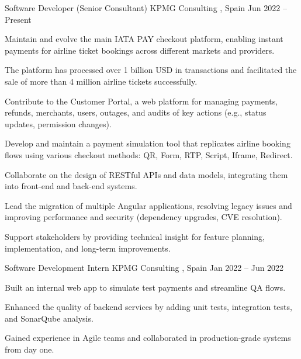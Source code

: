 

\begin{cventries}

  \cventry
    {Software Developer (Senior Consultant)} %
    {KPMG Consulting} %
    {\comMadrid, Spain} %
    {Jun 2022 – Present} %
    {
      \begin{cvitems} %
        \item {Maintain and evolve the main IATA PAY checkout platform, enabling instant payments for airline ticket bookings across different markets and providers.}
        \item {The platform has processed over 1 billion USD in transactions and facilitated the sale of more than 4 million airline tickets successfully.}
        \item {Contribute to the Customer Portal, a web platform for managing payments, refunds, merchants, users, outages, and audits of key actions (e.g., status updates, permission changes).}
        \item {Develop and maintain a payment simulation tool that replicates airline booking flows using various checkout methods: QR, Form, RTP, Script, Iframe, Redirect.}
        \item {Collaborate on the design of RESTful APIs and data models, integrating them into front-end and back-end systems.}
        \item {Lead the migration of multiple Angular applications, resolving legacy issues and improving performance and security (dependency upgrades, CVE resolution).}
        \item {Support stakeholders by providing technical insight for feature planning, implementation, and long-term improvements.}
      \end{cvitems}
    }

  \cventry
    {Software Development Intern} %
    {KPMG Consulting} %
    {\comMadrid, Spain} %
    {Jan 2022 – Jun 2022} %
    {
      \begin{cvitems} %
        \item {Built an internal web app to simulate test payments and streamline QA flows.}
        \item {Enhanced the quality of backend services by adding unit tests, integration tests, and SonarQube analysis.}
        \item {Gained experience in Agile teams and collaborated in production-grade systems from day one.}
      \end{cvitems}
    }

\end{cventries}
